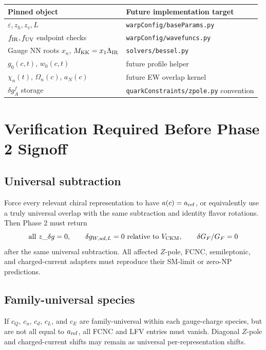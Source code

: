 \documentclass[11pt]{article}
\begin{document}
\begin{center}
\begin{tabular}{ll}
\hline
Pinned object & Future implementation target \\
\hline
\(\varepsilon,z_h,z_v,L\) & \texttt{warpConfig/baseParams.py} \\
\(f_{\rm IR}, f_{\rm UV}\) endpoint checks & \texttt{warpConfig/wavefuncs.py} \\
Gauge NN roots \(x_n\), \(M_{\rm KK}=x_1\Lambda_{\rm IR}\) &
  \texttt{solvers/bessel.py} \\
\(g_0(c,t)\), \(w_0(c,t)\) & future profile helper \\
\(\chi_n(t)\), \(\Omega_n(c)\), \(a_N(c)\) & future EW overlap kernel \\
\(\delta g_A^f\) storage & \texttt{quarkConstraints/zpole.py} convention \\
\hline
\end{tabular}
\end{center}

\section{Verification Required Before Phase 2 Signoff}

\subsection*{Universal subtraction}

Force every relevant chiral representation to have \(a(c)=a_{\rm ref}\), or
equivalently use a truly universal overlap with the same subtraction and
identity flavor rotations.  Then Phase 2 must return
\begin{equation}
  \text{all } z\_\delta g = 0,\qquad
  \delta g_{W,ud,L}=0 \text{ relative to } V_{\rm CKM},\qquad
  \delta G_F/G_F=0
\end{equation}
after the same universal subtraction.  All affected \(Z\)-pole, FCNC,
semileptonic, and charged-current adapters must reproduce their SM-limit or
zero-NP predictions.

\subsection*{Family-universal species}

If \(c_Q\), \(c_u\), \(c_d\), \(c_L\), and \(c_E\) are family-universal within
each gauge-charge species, but are not all equal to \(a_{\rm ref}\), all FCNC
and LFV entries must vanish.  Diagonal \(Z\)-pole and charged-current shifts
may remain as universal per-representation shifts.
\end{document}
